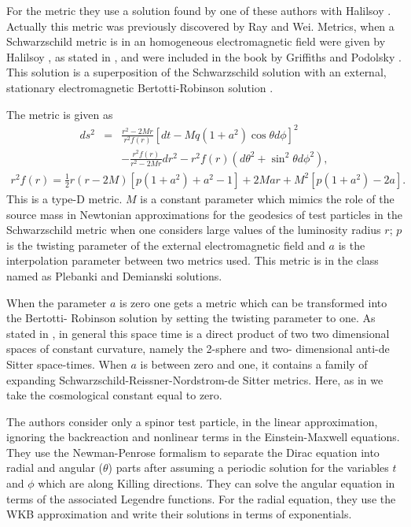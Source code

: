\documentclass{article}
\begin{document}
For the metric they use a solution found by one of these authors
with Halilsoy \cite{Halil}. Actually this metric
was previously discovered by  Ray and  Wei\cite{Ray}. Metrics, when
a Schwarzschild metric is in an homogeneous electromagnetic field
were given by Halilsoy \cite{Halil1, Halil2}, as stated in
\cite{Badawi2}, and were included in the book by Griffiths and
Podolsky \cite{podolsky}. This solution is a superposition of the
Schwarzschild \cite{Sch} solution with an external, stationary
electromagnetic Bertotti-Robinson solution \cite{ Bert, Rob}.

The metric is given as
\begin{eqnarray}
ds^{2}&=&\frac{r^{2}-2Mr}{r^{2}f(r)}\left[ dt-Mq(1+a^{2})\cos \theta d\phi \right] ^{2} \nonumber \\
&&-\frac{r^{2}f(r)}{r^{2}-2Mr}dr^{2}-r^{2}f(r)\left( d\theta
^{2}+\sin ^{2}\theta d\phi ^{2}\right),
\end{eqnarray}
\begin{eqnarray}
r^2f(r) =\frac{1}{2}r\left( r-2M\right) \left[ p\left(
1+a^{2}\right) +a^{2}-1\right] +2Mar+M^{2}\left[ p\left(
1+a^{2}\right) -2a\right].
\end{eqnarray}
This is a type-D metric. $M$ is a constant parameter
which mimics the role of the source mass in Newtonian
approximations for the geodesics of test particles in the
Schwarzschild metric when one considers large values of the
luminosity radius $r$; $p$ is the twisting parameter of the
external electromagnetic field and $a$ is the interpolation
parameter between two metrics used. This metric is in
the class named as Plebanki and Demianski solutions\cite{PD}.

When the parameter $a$ is zero one gets a metric which
can be transformed into the Bertotti- Robinson solution by setting
the twisting parameter to one. As stated in \cite{podolsky}, in
general this space time is a direct product of two two dimensional
spaces of constant curvature, namely the 2-sphere and two-
dimensional anti-de Sitter space-times. When $a$ is between zero
and one, it contains a family of expanding
Schwarzschild-Reissner-Nordstrom-de Sitter metrics. Here, as in
\cite{Ray,Halil} we take the cosmological constant equal to zero.

The authors consider only a spinor test particle, in the linear
approximation, ignoring the backreaction and nonlinear terms in
the Einstein-Maxwell equations. They use the Newman-Penrose
formalism \cite{Ted} to separate the Dirac equation into radial
and angular ($\theta$) parts after assuming a periodic solution
for the variables $t$ and $\phi$ which are along Killing
directions. They can solve the angular equation in terms of the
associated Legendre functions. For the radial equation, they use
the WKB approximation and write their solutions in terms of
exponentials.
\end{document}

